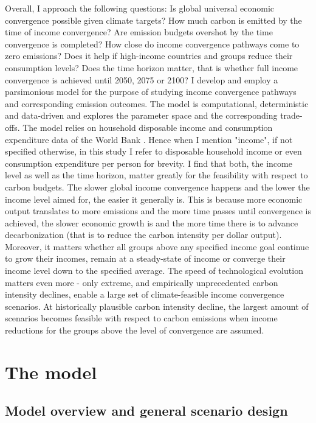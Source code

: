 \documentclass{article}
\begin{document}
Overall, I approach the following questions: Is global universal economic convergence possible given climate targets? How much carbon is emitted by the time of income convergence? Are emission budgets overshot by the time convergence is completed? How close do income convergence pathways come to zero emissions? Does it help if high-income countries and groups reduce their consumption levels? Does the time horizon matter, that is whether full income convergence is achieved until 2050, 2075 or 2100? I develop and employ a parsimonious model for the purpose of studying income convergence pathways and corresponding emission outcomes. The model is computational, deterministic and data-driven and explores the parameter space and the corresponding trade-offs. The model relies on household disposable income and consumption expenditure data of the World Bank \parencite{pip2024}. Hence when I mention "income", if not specified otherwise, in this study I refer to disposable household income or even consumption expenditure per person for brevity. I find that both, the income level as well as the time horizon, matter greatly for the feasibility with respect to carbon budgets. The slower global income convergence happens and the lower the income level aimed for, the easier it generally is. This is because more economic output translates to more emissions and the more time passes until convergence is achieved, the slower economic growth is and the more time there is to advance decarbonization (that is to reduce the carbon intensity per dollar output). Moreover, it matters whether all groups above any specified income goal continue to grow their incomes, remain at a steady-state of income or converge their income level down to the specified average. The speed of technological evolution matters even more - only extreme, and empirically unprecedented carbon intensity declines, enable a large set of climate-feasible income convergence scenarios. At historically plausible carbon intensity decline, the largest amount of scenarios becomes feasible with respect to carbon emissions when income reductions for the groups above the level of convergence are assumed.

\section{The model}



\subsection{Model overview and general scenario design}
\end{document}
